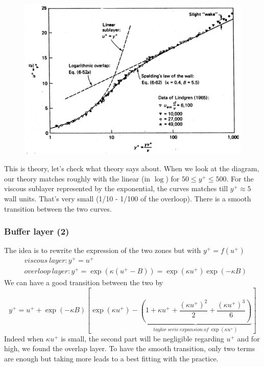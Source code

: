 		\begin{figure}
		\vspace{-5mm}
		\includegraphics[scale=0.2]{ch4/8}
		\end{figure}
		This is theory, let's check what theory says about. When we look at the diagram, our theory matches roughly with the linear (in $\log$) for $50\leq y^+ \leq 500$. For the viscous sublayer represented by the exponential, the curves matches till $y^+ \approx 5$ wall units. That's very small (1/10 - 1/100 of the overloop). There is a smooth transition between the two curves. 
		
		\subsubsection{Buffer layer (2)}
			The idea is to rewrite the expression of the two zones but with $y^+ = f(u^+)$ 
			\begin{equation}
			\begin{aligned}
				&viscous \ layer : y^+ = u^+\\
				&overloop \ layer : y^+ =  \exp (\kappa(u^+ - B))= \exp (\kappa u^+)\exp (-\kappa B)
			\end{aligned}
			\end{equation}
			We can have a good transition between the two by 
			\begin{equation}
				y^+ = u^+ + \exp (-\kappa B)\left[ \exp(\kappa u^+) - \underbrace{\left( 1 + \kappa u^+ +  \frac{(\kappa u^+)^2}{2}  +  \frac{(\kappa u^+)^3}{6}\right)}_{taylor \ serie \ expansion \ of\ \exp(\kappa u^+)}\right]
			\end{equation}
			Indeed when $\kappa u^+$ is small, the second part will be negligible regarding $u^+$ and for high, we found the overlap layer. To have the smooth transition, only two terms are enough but taking more leads to a best fitting with the practice. 